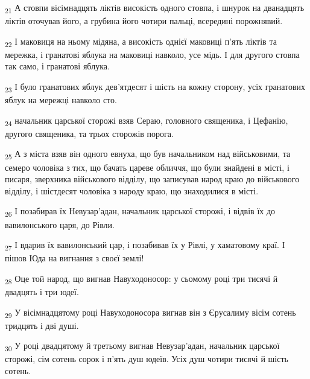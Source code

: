 \begin{tcolorbox}
\textsubscript{21} А стовпи вісімнадцять ліктів високість одного стовпа, і шнурок на дванадцять ліктів оточував його, а грубина його чотири пальці, всередині порожнявий.
\end{tcolorbox}
\begin{tcolorbox}
\textsubscript{22} І маковиця на ньому мідяна, а високість однієї маковиці п'ять ліктів та мережка, і гранатові яблука на маковиці навколо, усе мідь. І для другого стовпа так само, і гранатові яблука.
\end{tcolorbox}
\begin{tcolorbox}
\textsubscript{23} І було гранатових яблук дев'ятдесят і шість на кожну сторону, усіх гранатових яблук на мережці навколо сто.
\end{tcolorbox}
\begin{tcolorbox}
\textsubscript{24} начальник царської сторожі взяв Сераю, головного священика, і Цефанію, другого священика, та трьох сторожів порога.
\end{tcolorbox}
\begin{tcolorbox}
\textsubscript{25} А з міста взяв він одного евнуха, що був начальником над військовими, та семеро чоловіка з тих, що бачать цареве обличчя, що були знайдені в місті, і писаря, зверхника військового відділу, що записував народ краю до військового відділу, і шістдесят чоловіка з народу краю, що знаходилися в місті.
\end{tcolorbox}
\begin{tcolorbox}
\textsubscript{26} І позабирав їх Невузар'адан, начальник царської сторожі, і відвів їх до вавилонського царя, до Рівли.
\end{tcolorbox}
\begin{tcolorbox}
\textsubscript{27} І вдарив їх вавилонський цар, і позабивав їх у Рівлі, у хаматовому краї. І пішов Юда на вигнання з своєї землі!
\end{tcolorbox}
\begin{tcolorbox}
\textsubscript{28} Оце той народ, що вигнав Навуходоносор: у сьомому році три тисячі й двадцять і три юдеї.
\end{tcolorbox}
\begin{tcolorbox}
\textsubscript{29} У вісімнадцятому році Навуходоносора вигнав він з Єрусалиму вісім сотень тридцять і дві душі.
\end{tcolorbox}
\begin{tcolorbox}
\textsubscript{30} У році двадцятому й третьому вигнав Невузар'адан, начальник царської сторожі, сім сотень сорок і п'ять душ юдеїв. Усіх душ чотири тисячі й шість сотень.
\end{tcolorbox}
